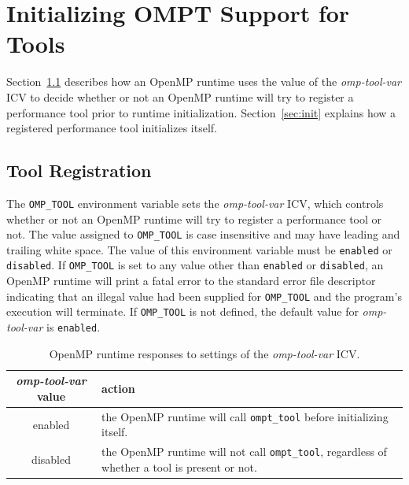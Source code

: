 \documentclass{article}
\begin{document}
\section{Initializing OMPT Support for Tools}
\label{sec:enabling}

Section~\ref{sec:env} describes how an OpenMP runtime uses the value of the {\em omp-tool-var} ICV to decide whether or not an OpenMP runtime will try to register a performance tool prior to runtime initialization.
Section~\ref{sec:init} explains how a registered performance tool initializes itself.

\subsection{Tool Registration}
\label{sec:env}

The  \lstinline|OMP_TOOL| environment variable sets the {\em omp-tool-var} ICV, which controls whether or not an OpenMP 
runtime will try to register a performance tool or not. The value assigned to \lstinline|OMP_TOOL| is 
case insensitive and may have leading and trailing white space.  The value of
this environment variable must be \lstinline|enabled| or \lstinline|disabled|.   If  \lstinline|OMP_TOOL| is set to any value other than \lstinline|enabled| or \lstinline|disabled|, an OpenMP runtime will print a fatal error  to the standard error file descriptor indicating that an illegal value had been supplied for \lstinline|OMP_TOOL| and the program's execution will terminate. If \lstinline|OMP_TOOL| is not defined, the default value for  {\em omp-tool-var}  is  \lstinline|enabled|.

 \begin{table}
\begin{center}
\begin{tabular}{|c|p{4.5in}|}
\hline
 {\em omp-tool-var} value & action \\\hline
enabled & the OpenMP runtime will call  \lstinline|ompt_tool| before initializing itself.   \\\hline
disabled & the OpenMP runtime will not call  \lstinline|ompt_tool|, regardless of whether a tool is present or not.  \\\hline
\end{tabular}
\end{center}
\caption{OpenMP runtime responses to settings of the {\em omp-tool-var} ICV.}
\label{table:env-var}
\end{table}
\end{document}
